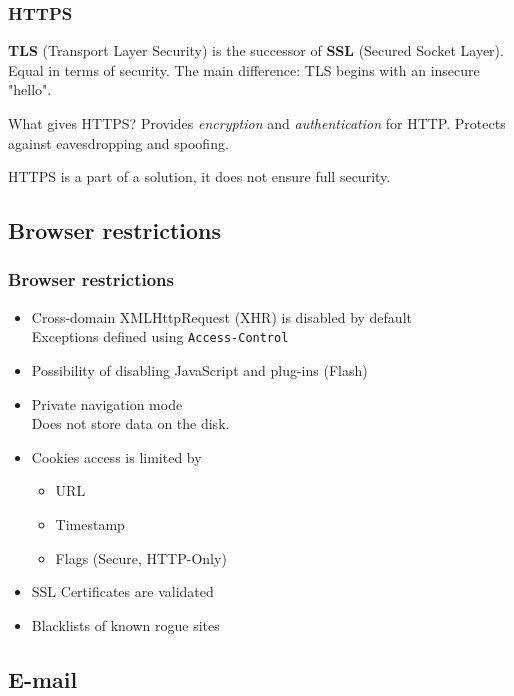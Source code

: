 \begin{frame}
\frametitle{HTTPS}
\textbf{TLS} (Transport Layer Security) is the successor of \textbf{SSL}
(Secured Socket Layer).
Equal in terms of security.
The main difference: TLS begins with an insecure "hello".
\begin{block}{What gives HTTPS?}
Provides \emph{encryption} and \emph{authentication} for HTTP.
\newline Protects against eavesdropping and spoofing.
\end{block}
\vspace{1em}
HTTPS is a part of a solution, it does not ensure full security.
\end{frame}

\subsection{Browser restrictions}

\begin{frame}
\frametitle{Browser restrictions}
\begin{itemize}
\item Cross-domain XMLHttpRequest (XHR) is disabled by default
	\\ Exceptions defined using \texttt{Access-Control}
\item Possibility of disabling JavaScript and plug-ins (Flash)
\item Private navigation mode
	\\ Does not store data on the disk.
\item Cookies access is limited by
	\begin{itemize}
	\item URL
	\item Timestamp
	\item Flags (Secure, HTTP-Only)
	\end{itemize}
\item SSL Certificates are validated
\item Blacklists of known rogue sites
\end{itemize}
\end{frame}

\subsection{E-mail}

